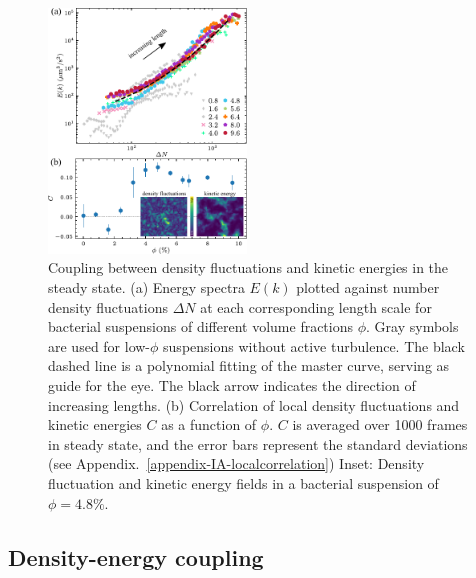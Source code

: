 \documentclass[twocolumn,aps,prx,amsmath,amssymb,longbibliography,superscriptaddress]{revtex4-2}
\begin{document}
\begin{figure}[t]
\begin{center}
\includegraphics[width=0.47\textwidth]{Figures/fig-5.pdf}
\caption[The correlation between GNF and kinetic energy and kinetic energy spectra.]
{
Coupling between density fluctuations and kinetic energies in the steady state.
(a) Energy spectra $E(k)$ plotted against number density fluctuations $\Delta N$ at each corresponding length scale for bacterial suspensions of different volume fractions $\phi$. Gray symbols are used for low-$\phi$ suspensions without active turbulence. The black dashed line is a polynomial fitting of the master curve, serving as guide for the eye. The black arrow indicates the direction of increasing lengths.
(b) Correlation of local density fluctuations and kinetic energies $C$ as a function of $\phi$. $C$ is averaged over 1000 frames in steady state, and the error bars represent the standard deviations (see Appendix.~\ref{appendix-IA-localcorrelation}) Inset: Density fluctuation and kinetic energy fields in a bacterial suspension of $\phi = 4.8\%$.
}
\label{fig:GNF-energy-spectra-correlation}
\end{center}
\end{figure}

\subsection{Density-energy coupling} \label{Density-flow coupling}
\end{document}
